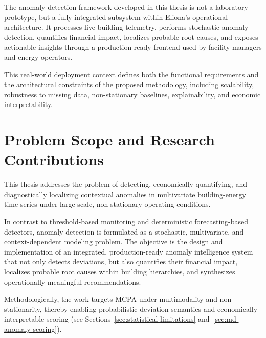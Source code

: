 The anomaly-detection framework developed in this thesis is not a laboratory prototype, but a fully integrated subsystem within Eliona’s operational architecture. It processes live building telemetry, performs stochastic anomaly detection, quantifies financial impact, localizes probable root causes, and exposes actionable insights through a production-ready frontend used by facility managers and energy operators.

This real-world deployment context defines both the functional requirements and the architectural constraints of the proposed methodology, including scalability, robustness to missing data, non-stationary baselines, explainability, and economic interpretability.

\section{Problem Scope and Research Contributions}
\label{sec:scope-contributions}

This thesis addresses the problem of detecting, economically quantifying, and
diagnostically localizing contextual anomalies in multivariate building-energy time
series under large-scale, non-stationary operating conditions.

In contrast to threshold-based monitoring and deterministic forecasting-based
detectors, anomaly detection is formulated as a stochastic, multivariate, and
context-dependent modeling problem. The objective is the design and implementation of
an integrated, production-ready anomaly intelligence system that not only detects
deviations, but also quantifies their financial impact, localizes probable root causes
within building hierarchies, and synthesizes operationally meaningful recommendations.

Methodologically, the work targets \ac{MCPA} under multimodality and non-stationarity,
thereby enabling probabilistic deviation semantics and economically interpretable
scoring (see Sections~\ref{sec:statistical-limitations} and~\ref{sec:md-anomaly-scoring}).

